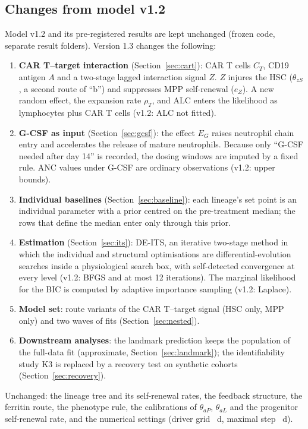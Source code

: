 \documentclass[11pt]{article}
\begin{document}
\subsection{Changes from model v1.2}\label{sec:changes}
Model v1.2 and its pre-registered results are kept unchanged (frozen code, separate result folders). Version 1.3 changes the following:
\begin{enumerate}
\item \textbf{CAR T--target interaction} (Section~\ref{sec:cart}): CAR T cells $C_T$, CD19 antigen $A$ and a two-stage lagged interaction signal $Z$. $Z$ injures the HSC ($\theta_{zS}$, a second route of ``b'') and suppresses MPP self-renewal ($e_Z$). A new random effect, the expansion rate $\rho_T$, and ALC enters the likelihood as lymphocytes plus CAR T cells (v1.2: ALC not fitted).
\item \textbf{G-CSF as input} (Section~\ref{sec:gcsf}): the effect $E_G$ raises neutrophil chain entry and accelerates the release of mature neutrophils. Because only ``G-CSF needed after day 14'' is recorded, the dosing windows are imputed by a fixed rule. ANC values under G-CSF are ordinary observations (v1.2: upper bounds).
\item \textbf{Individual baselines} (Section~\ref{sec:baseline}): each lineage's set point is an individual parameter with a prior centred on the pre-treatment median; the rows that define the median enter only through this prior.
\item \textbf{Estimation} (Section~\ref{sec:its}): DE-ITS, an iterative two-stage method in which the individual and structural optimisations are differential-evolution searches inside a physiological search box, with self-detected convergence at every level (v1.2: BFGS and at most 12 iterations). The marginal likelihood for the BIC is computed by adaptive importance sampling (v1.2: Laplace).
\item \textbf{Model set}: route variants of the CAR T--target signal (HSC only, MPP only) and two waves of fits (Section~\ref{sec:nested}).
\item \textbf{Downstream analyses}: the landmark prediction keeps the population of the full-data fit (approximate, Section~\ref{sec:landmark}); the identifiability study K3 is replaced by a recovery test on synthetic cohorts (Section~\ref{sec:recovery}).
\end{enumerate}
Unchanged: the lineage tree and its self-renewal rates, the feedback structure, the ferritin route, the phenotype rule, the calibrations of $\theta_{aP}$, $\theta_{aL}$ and the progenitor self-renewal rate, and the numerical settings (driver grid \valDrvDt~d, maximal step \valHmax~d).
\end{document}
